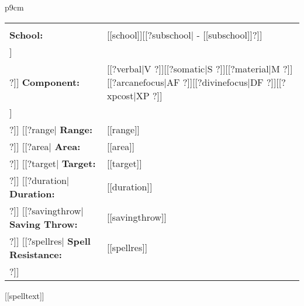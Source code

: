 \noindent



\begin{supertabular}{p{9cm}}
  \begin{center}
  \begin{tabular}{>{\raggedleft}p{4cm}>{\raggedright}p{4cm}}
    \multicolumn{1}{>{\raggedright}p{4cm}}{
      \scshape\footnotesize{[[book]]}
    } &
    \multicolumn{1}{>{\raggedleft}p{4cm}}{
      \scshape\footnotesize{[[class]] [[level]]}
    }\tabularnewline
    \rule{0pt}{4ex}
    \textbf{School:} & [[school]][[?subschool| - [[subschool]]?]] \tabularnewline
[[?descriptor|    \textbf{Descriptors:} & [[descriptor]] \tabularnewline?]]
    \textbf{Component:} &  [[?verbal|V ?]][[?somatic|S ?]][[?material|M ?]][[?arcanefocus|AF ?]][[?divinefocus|DF ?]][[?xpcost|XP ?]] \tabularnewline
[[?castingtime|    \textbf{Casting Time:} & [[castingtime]] \tabularnewline?]]
[[?range|    \textbf{Range:} & {[[range]]} \tabularnewline?]]
[[?area|    \textbf{Area:} & [[area]] \tabularnewline?]]
[[?target|    \textbf{Target:} & [[target]] \tabularnewline?]]
[[?duration|    \textbf{Duration:} & {[[duration]]} \tabularnewline?]]
[[?savingthrow|    \textbf{Saving Throw:} & [[savingthrow]] \tabularnewline?]]
[[?spellres|    \textbf{Spell Resistance:} & [[spellres]] \tabularnewline?]]
  \multicolumn{2}{c}{
    \pgfornament[width=3cm]{87}
   }\tabularnewline
  \end{tabular}
  \end{center}
[[spelltext]]\\
\rule{0pt}{4ex} \\
\end{supertabular} 
